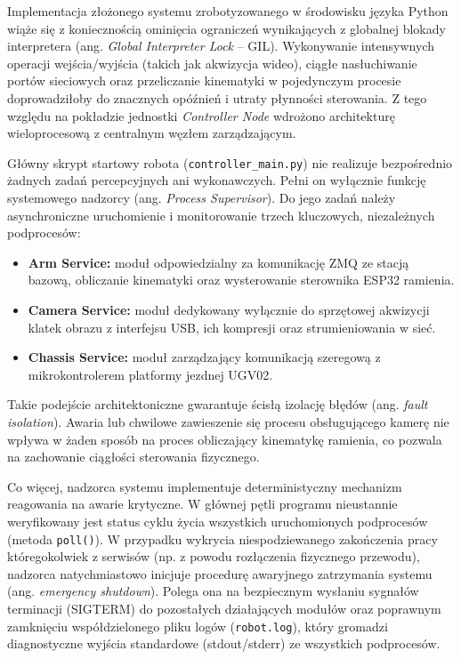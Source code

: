 \documentclass[11pt]{extreport}
\begin{document}
Implementacja złożonego systemu zrobotyzowanego w środowisku języka Python wiąże się z koniecznością ominięcia ograniczeń wynikających z globalnej blokady interpretera (ang. \textit{Global Interpreter Lock} -- GIL). Wykonywanie intensywnych operacji wejścia/wyjścia (takich jak akwizycja wideo), ciągłe nasłuchiwanie portów sieciowych oraz przeliczanie kinematyki w pojedynczym procesie doprowadziłoby do znacznych opóźnień i utraty płynności sterowania. Z tego względu na pokładzie jednostki \textit{Controller Node} wdrożono architekturę wieloprocesową z centralnym węzłem zarządzającym.

Główny skrypt startowy robota (\texttt{controller\_main.py}) nie realizuje bezpośrednio żadnych zadań percepcyjnych ani wykonawczych. Pełni on wyłącznie funkcję systemowego nadzorcy (ang. \textit{Process Supervisor}). Do jego zadań należy asynchroniczne uruchomienie i monitorowanie trzech kluczowych, niezależnych podprocesów:
\begin{itemize}
    \item \textbf{Arm Service:} moduł odpowiedzialny za komunikację ZMQ ze stacją bazową, obliczanie kinematyki oraz wysterowanie sterownika ESP32 ramienia.
    \item \textbf{Camera Service:} moduł dedykowany wyłącznie do sprzętowej akwizycji klatek obrazu z interfejsu USB, ich kompresji oraz strumieniowania w sieć.
    \item \textbf{Chassis Service:} moduł zarządzający komunikacją szeregową z mikrokontrolerem platformy jezdnej UGV02.
\end{itemize}

Takie podejście architektoniczne gwarantuje ścisłą izolację błędów (ang. \textit{fault isolation}). Awaria lub chwilowe zawieszenie się procesu obsługującego kamerę nie wpływa w żaden sposób na proces obliczający kinematykę ramienia, co pozwala na zachowanie ciągłości sterowania fizycznego.

Co więcej, nadzorca systemu implementuje deterministyczny mechanizm reagowania na awarie krytyczne. W głównej pętli programu nieustannie weryfikowany jest status cyklu życia wszystkich uruchomionych podprocesów (metoda \texttt{poll()}). W przypadku wykrycia niespodziewanego zakończenia pracy któregokolwiek z serwisów (np. z powodu rozłączenia fizycznego przewodu), nadzorca natychmiastowo inicjuje procedurę awaryjnego zatrzymania systemu (ang. \textit{emergency shutdown}). Polega ona na bezpiecznym wysłaniu sygnałów terminacji (SIGTERM) do pozostałych działających modułów oraz poprawnym zamknięciu współdzielonego pliku logów (\texttt{robot.log}), który gromadzi diagnostyczne wyjścia standardowe (stdout/stderr) ze wszystkich podprocesów.
\end{document}
